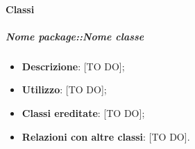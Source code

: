    \paragraph{Classi} %
      \subparagraph{Nome package::Nome classe} %
      \label{subp:subparagraph_name}
        \begin{itemize}
          \item \textbf{Descrizione}: [TO DO];
          \item \textbf{Utilizzo}: [TO DO];
          \item \textbf{Classi ereditate}: [TO DO];
          \item \textbf{Relazioni con altre classi}: [TO DO].
        \end{itemize}



